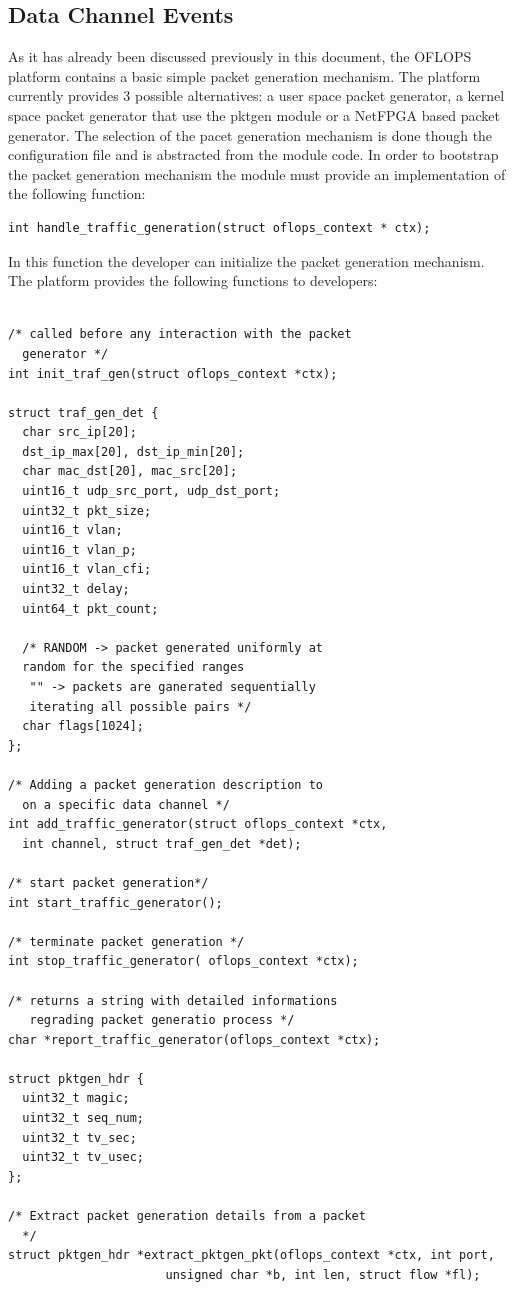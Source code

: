 \documentclass{book}
\begin{document}
\subsection{Data Channel Events}

As it has already been discussed previously in this document, the OFLOPS platform contains a basic simple packet generation 
mechanism. The platform currently provides 3 possible alternatives: a user space packet generator, a kernel space packet generator
that use the pktgen module or a NetFPGA based packet generator. The selection of the pacet generation mechanism is done though the 
configuration file and is abstracted from the module code. In order to bootstrap the packet generation mechanism the module must 
provide an implementation of the following function:

\begin{lstlisting}
int handle_traffic_generation(struct oflops_context * ctx);
\end{lstlisting}

In this function the developer can initialize the packet generation mechanism. The platform provides the following functions 
to developers:

\begin{lstlisting}

/* called before any interaction with the packet
  generator */
int init_traf_gen(struct oflops_context *ctx);

struct traf_gen_det {
  char src_ip[20];
  dst_ip_max[20], dst_ip_min[20];
  char mac_dst[20], mac_src[20];
  uint16_t udp_src_port, udp_dst_port;
  uint32_t pkt_size;
  uint16_t vlan;
  uint16_t vlan_p;
  uint16_t vlan_cfi;
  uint32_t delay;
  uint64_t pkt_count;
  
  /* RANDOM -> packet generated uniformly at 
  random for the specified ranges 
   "" -> packets are ganerated sequentially 
   iterating all possible pairs */
  char flags[1024];
};

/* Adding a packet generation description to 
  on a specific data channel */
int add_traffic_generator(struct oflops_context *ctx, 
  int channel, struct traf_gen_det *det);

/* start packet generation*/
int start_traffic_generator();

/* terminate packet generation */
int stop_traffic_generator( oflops_context *ctx);

/* returns a string with detailed informations 
   regrading packet generatio process */
char *report_traffic_generator(oflops_context *ctx);

struct pktgen_hdr {
  uint32_t magic;
  uint32_t seq_num;
  uint32_t tv_sec;
  uint32_t tv_usec;
};

/* Extract packet generation details from a packet 
  */
struct pktgen_hdr *extract_pktgen_pkt(oflops_context *ctx, int port,
				      unsigned char *b, int len, struct flow *fl);

\end{lstlisting}
\end{document}
